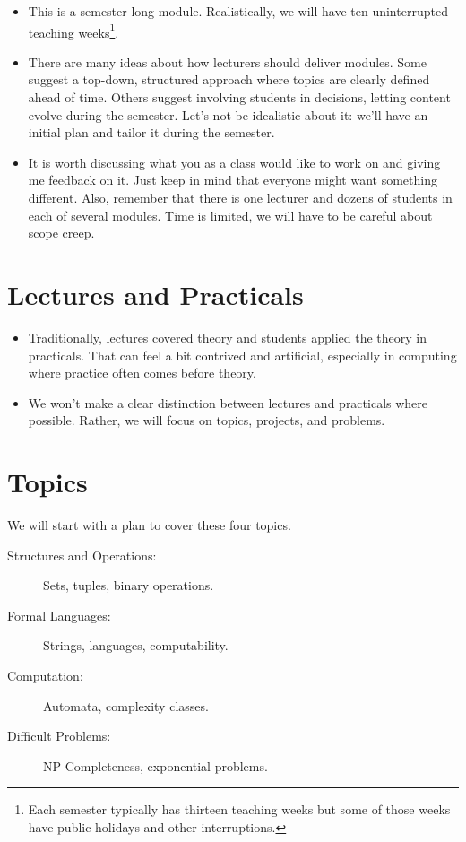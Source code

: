 \documentclass{iansnotes}
\begin{document}
\begin{itemize}
  \item This is a semester-long module. Realistically, we will have ten uninterrupted teaching weeks\footnote{Each semester typically has thirteen teaching weeks but some of those weeks have public holidays and other interruptions.}.
  \item There are many ideas about how lecturers should deliver modules. Some suggest a top-down, structured approach where topics are clearly defined ahead of time. Others suggest involving students in decisions, letting content evolve during the semester. Let's not be idealistic about it: we'll have an initial plan and tailor it during the semester.
  \item It is worth discussing what you as a class would like to work on and giving me feedback on it. Just keep in mind that everyone might want something different. Also, remember that there is one lecturer and dozens of students in each of several modules. Time is limited, we will have to be careful about scope creep.
\end{itemize}

 
\section{Lectures and Practicals}

\begin{itemize}
  \item Traditionally, lectures covered theory and students applied the theory in practicals. That can feel a bit contrived and artificial, especially in computing where practice often comes before theory.
  \item We won't make a clear distinction between lectures and practicals where possible. Rather, we will focus on topics, projects, and problems.
\end{itemize}


\section{Topics}

We will start with a plan to cover these four topics.

\begin{description}
  \item[Structures and Operations:] Sets, tuples, binary operations.
  \item[Formal Languages:] Strings, languages, computability.
  \item[Computation:] Automata, complexity classes.
  \item[Difficult Problems:] NP Completeness, exponential problems.
\end{description}
\end{document}
